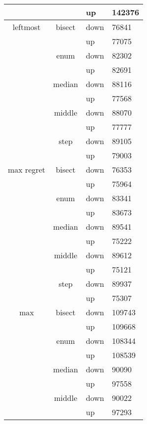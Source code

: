 \begin{longtable}{llll}
          &       & up    & 142376 \\\hline
    \multicolumn{1}{c}{leftmost} & \multicolumn{1}{c}{bisect} & down  & 76841 \\
          &       & up    & 77075 \\
          & \multicolumn{1}{c}{enum} & down  & 82302 \\
          &       & up    & 82691 \\
          & \multicolumn{1}{c}{median} & down  & 88116 \\
          &       & up    & 77568 \\
          & \multicolumn{1}{c}{middle} & down  & 88070 \\
          &       & up    & 77777 \\
          & \multicolumn{1}{c}{step} & down  & 89105 \\
          &       & up    & 79003 \\\hline
    \multicolumn{1}{c}{max regret} & \multicolumn{1}{c}{bisect} & down  & 76353 \\
          &       & up    & 75964 \\
          & \multicolumn{1}{c}{enum} & down  & 83341 \\
          &       & up    & 83673 \\
          & \multicolumn{1}{c}{median} & down  & 89541 \\
          &       & up    & 75222 \\
          & \multicolumn{1}{c}{middle} & down  & 89612 \\
          &       & up    & 75121 \\
          & \multicolumn{1}{c}{step} & down  & 89937 \\
          &       & up    & 75307 \\\hline
    \multicolumn{1}{c}{max} & \multicolumn{1}{c}{bisect} & down  & 109743 \\
          &       & up    & 109668 \\
          & \multicolumn{1}{c}{enum} & down  & 108344 \\
          &       & up    & 108539 \\
          & \multicolumn{1}{c}{median} & down  & 90090 \\
          &       & up    & 97558 \\
          & \multicolumn{1}{c}{middle} & down  & 90022 \\
          &       & up    & 97293 \\

\end{longtable}
